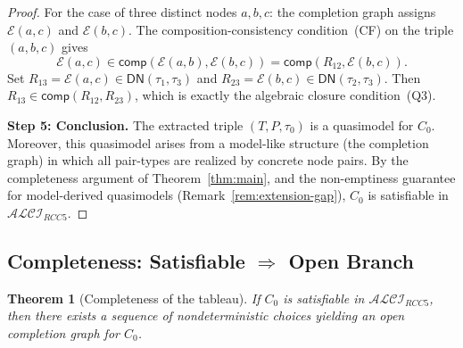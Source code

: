 \documentclass[a4paper,11pt]{article}
\newtheorem{theorem}{Theorem}[section]
\theoremstyle{definition}
\newcommand{\ALCIRCC}[1]{\ensuremath{\mathcal{ALCI}_{\mathit{RCC#1}}}}
\newcommand{\comp}{\ensuremath{\mathsf{comp}}}
\begin{document}
\begin{proof}
For the case of three distinct nodes $a, b, c$: the completion graph
assigns $\mathcal{E}(a,c)$ and $\mathcal{E}(b,c)$.  The
composition-consistency condition~(CF) on the triple $(a, b, c)$ gives
\[
  \mathcal{E}(a,c) \in \comp(\mathcal{E}(a,b), \mathcal{E}(b,c))
  = \comp(R_{12}, \mathcal{E}(b,c)).
\]
Set $R_{13} = \mathcal{E}(a,c) \in \mathsf{DN}(\tau_1, \tau_3)$
and $R_{23} = \mathcal{E}(b,c) \in \mathsf{DN}(\tau_2, \tau_3)$.
Then $R_{13} \in \comp(R_{12}, R_{23})$, which is exactly the
algebraic closure condition~(Q3).

\medskip\noindent\textbf{Step 5: Conclusion.}\; The extracted triple
$(T, P, \tau_0)$ is a quasimodel for $C_0$.  Moreover, this
quasimodel arises from a model-like structure (the completion graph)
in which all pair-types are realized by concrete node pairs.  By the
completeness argument of Theorem~\ref{thm:main}, and the
non-emptiness guarantee for model-derived quasimodels
(Remark~\ref{rem:extension-gap}), $C_0$ is satisfiable in
$\ALCIRCC{5}$.
\end{proof}

\subsection{Completeness: Satisfiable $\Rightarrow$ Open Branch}
\label{sec:tab-completeness}

\begin{theorem}[Completeness of the tableau]
\label{thm:tab-completeness}
If $C_0$ is satisfiable in $\ALCIRCC{5}$, then there exists a
sequence of nondeterministic choices yielding an open completion graph
for $C_0$.
\end{theorem}
\end{document}
